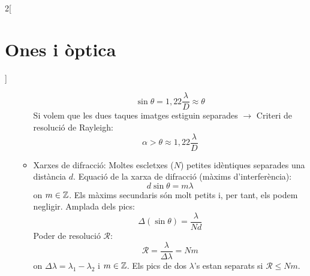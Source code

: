 \documentclass[../../../main.tex]{subfiles}
\begin{document}
\begin{multicols}{2}[\section{Ones i òptica}]
\begin{itemize}
\begin{itemize}
\begin{minipage}{\linewidth}
                    $$\sin\theta=1,22\frac{\lambda}{D}\approx\theta$$
                    Si volem que les dues taques imatges estiguin separades $\rightarrow$
                    Criteri de resolució de Rayleigh: $$\alpha>\theta\approx1,22\frac{\lambda}{D}$$
                  \end{minipage}
            \item Xarxes de difracció: Moltes escletxes ($N$) petites idèntiques separades una distància $d$.\newline
                  Equació de la xarxa de difracció (màxims d'interferència): $$d\sin\theta=m\lambda$$ {\footnotesize on $m\in\mathbb{Z}$.}\newline
                  Els màxims secundaris són molt petits i, per tant, els podem ne\-gli\-gir.\newline
                  Amplada dels pics: $$\Delta(\sin\theta)=\frac{\lambda}{Nd}$$
                  Poder de resolució $\mathcal{R}$: $$\mathcal{R}=\frac{\lambda}{\Delta\lambda}=Nm$$ {\footnotesize on $\Delta\lambda=\lambda_1-\lambda_2$ i $m\in\mathbb{Z}$.}\newline
                  Els pics de dos $\lambda$'s estan separats si $\mathcal{R}\leq Nm$.
          \end{itemize}
  \end{itemize}
\end{multicols}
\end{document}

